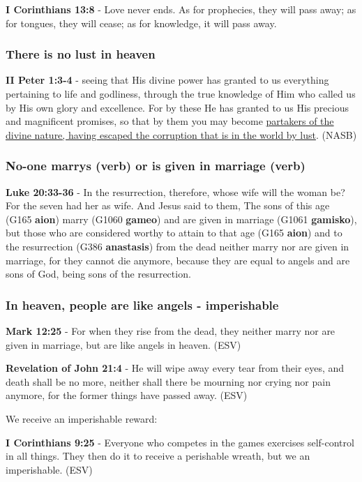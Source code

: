 \documentclass[11pt]{article}
\begin{document}
\textbf{I Corinthians 13:8} - Love never ends. As for prophecies, they will pass away; as for tongues, they will cease; as for knowledge, it will pass away.

\subsubsection{There is no lust in heaven}
\label{sec:orga95b048}

\textbf{II Peter 1:3-4} - seeing that His divine power has granted to us everything pertaining to life and godliness, through the true knowledge of Him who called us by His own glory and excellence. For by these He has granted to us His precious and magnificent promises, so that by them you may become \uline{partakers of the divine nature, having escaped the corruption that is in the world by lust}. (NASB)

\subsubsection{No-one \textbf{marrys} (verb) or is \textbf{given in marriage} (verb)}
\label{sec:org8f7443d}
\textbf{Luke 20:33-36} - In the resurrection, therefore, whose wife will the woman be? For the seven had her as wife. And Jesus said to them, The sons of this age (G165 \textbf{aion}) marry (G1060 \textbf{gameo}) and are given in marriage (G1061 \textbf{gamisko}), but those who are considered worthy to attain to that age (G165 \textbf{aion}) and to the resurrection (G386 \textbf{anastasis}) from the dead neither marry nor are given in marriage, for they cannot die anymore, because they are equal to angels and are sons of God, being sons of the resurrection.

\subsubsection{In heaven, people are like angels - imperishable}
\label{sec:orgeb1086a}
\textbf{Mark 12:25} -  For when they rise from the dead, they neither marry nor are given in marriage, but are like angels in heaven. (ESV)

\textbf{Revelation of John 21:4} - He will wipe away every tear from their eyes, and death shall be no more, neither shall there be mourning nor crying nor pain anymore, for the former things have passed away. (ESV)

We receive an imperishable reward:

\textbf{I Corinthians 9:25} - Everyone who competes in the games exercises self-control in all things. They then do it to receive a perishable wreath, but we an imperishable. (ESV)
\end{document}
